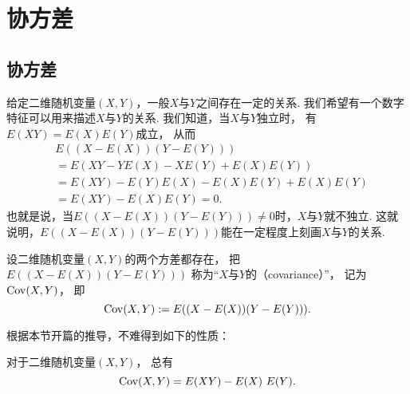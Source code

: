 \section{协方差}
\subsection{协方差}
给定二维随机变量\((X,Y)\)，一般\(X\)与\(Y\)之间存在一定的关系.
我们希望有一个数字特征可以用来描述\(X\)与\(Y\)的关系.
我们知道，当\(X\)与\(Y\)独立时，
有\(E(XY) = E(X) E(Y)\)成立，
从而\begin{align*}
    &E((X-E(X))(Y-E(Y))) \\
    &= E(XY - Y E(X) - X E(Y) + E(X) E(Y)) \\
    &= E(XY) - E(Y) E(X) - E(X) E(Y) + E(X) E(Y) \\
    &= E(XY) - E(X) E(Y) = 0.
\end{align*}
也就是说，当\(E((X-E(X))(Y-E(Y))) \neq 0\)时，\(X\)与\(Y\)就不独立.
这就说明，\(E((X-E(X))(Y-E(Y)))\)能在一定程度上刻画\(X\)与\(Y\)的关系.

\begin{definition}
设二维随机变量\((X,Y)\)的两个方差都存在，
把\(E((X-E(X))(Y-E(Y)))\)
称为“\(X\)与\(Y\)的（covariance）”，
记为\(\operatorname{Cov}(X,Y)\)，
即\begin{equation}\label{equation:随机变量的数字特征.协方差的定义式}
    \operatorname{Cov}(X,Y) := E((X-E(X))(Y-E(Y))).
\end{equation}
\end{definition}

根据本节开篇的推导，不难得到如下的性质：
\begin{property}\label{theorem:随机变量的数字特征.协方差的性质1}
对于二维随机变量\((X,Y)\)，
总有\begin{equation}\label{equation:随机变量的数字特征.协方差的计算式1}
    \operatorname{Cov}(X,Y) = E(XY) - E(X)~E(Y).
\end{equation}
\end{property}

